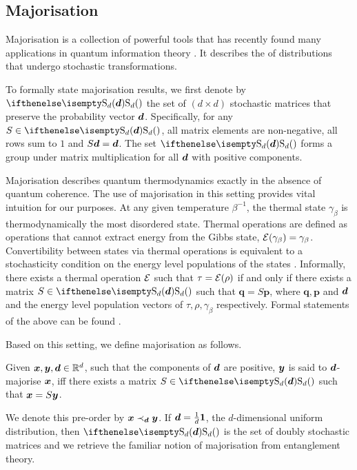 \documentclass[pra,
aps,
twocolumn,
superscriptaddress,
groupedaddress,
nofootinbib,
reprint
]{revtex4-1}
\begin{document}
\subsection{Majorisation}
\label{sec:major}

Majorisation is a collection of powerful tools that has recently found many applications in quantum information theory .
It describes the  of distributions that undergo stochastic transformations.

To formally state majorisation results, we first denote by $\stoch$ the set of $(d \times d)$ stochastic matrices that preserve the probability vector $\bm{d}$.
Specifically, for any $S \in \stoch$, all matrix elements are non-negative, all rows sum to $1$ and $S\bm{d} = \bm{d}$.
The set $\stoch$ forms a group under matrix multiplication for all $\bm{d}$ with positive components.

Majorisation describes quantum thermodynamics exactly in the absence of quantum coherence.
The use of majorisation in this setting provides vital intuition for our purposes.
At any given temperature $\beta^{-1}$, the thermal state $\gamma_\beta$ is thermodynamically the most disordered state. 
Thermal operations are defined as operations that cannot extract energy from the Gibbs state, $\mathcal{E}(\gamma_\beta) = \gamma_\beta$.
Convertibility between states via thermal operations is equivalent to a stochasticity condition on the energy level populations of the states .
Informally, there exists a thermal operation $\mathcal{E}$ such that $\tau = \mathcal{E}(\rho)$ if and only if there exists a matrix $S \in \stoch$ such that $\bm{q} = S\bm{p}$, where $\bm{q}, \bm{p}$ and $\bm{d}$ and the energy level population vectors of $\tau, \rho, \gamma_\beta$ respectively.
Formal statements of the above can be found .

Based on this setting, we define majorisation as follows.
\begin{definition}\label{def:dmajor}
    Given $\bm{x}, \bm{y}, \bm{d} \in \mathbb{R}^d$, such that the components of $\bm{d}$ are positive, $\bm{y}$ is said to $\bm{d}$-majorise $\bm{x}$, iff there exists a matrix $S \in \stoch$ such that $\bm{x} = S\bm{y}$.
\end{definition}
We denote this pre-order by $\bm{x} \prec_{\bm{d}} \bm{y}$.
If $\bm{d} = \frac{1}{d}\bm{1}$, the $d$-dimensional uniform distribution, then $\stoch$ is the set of doubly stochastic matrices and we retrieve the familiar notion of majorisation from entanglement theory. 
\end{document}
